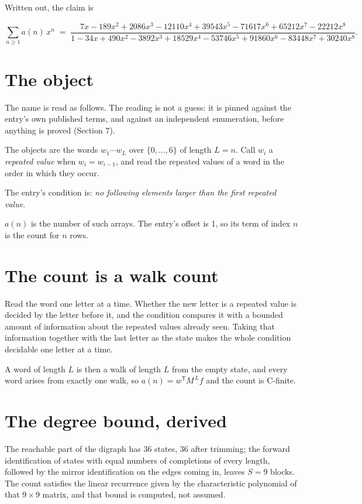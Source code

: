 \documentclass[11pt]{article}
\theoremstyle{definition}
\begin{document}
Written out, the claim is

\[\sum_{n \ge 1} a(n)\,x^n \;=\; \frac{7x - 189x^{2} + 2086x^{3} - 12110x^{4} + 39543x^{5} - 71617x^{6} + 65212x^{7} - 22212x^{8}}{1 - 34x + 490x^{2} - 3892x^{3} + 18529x^{4} - 53746x^{5} + 91860x^{6} - 83448x^{7} + 30240x^{8}}.\]

\section{The object}

The name is read as follows. The reading is not a guess: it is pinned against the entry's own published terms, and against an independent enumeration, before anything is proved (Section 7).

The objects are the words $w_1\cdots w_L$ over $\{0,\dots,6\}$ of length $L = n$. Call $w_i$ a {\itshape repeated value} when $w_i = w_{i-1}$, and read the repeated values of a word in the order in which they occur.

The entry's condition is: {\itshape no following elements larger than the first repeated value}.

$a(n)$ is the number of such arrays. The entry's offset is 1, so its term of index $n$ is the count for $n$ rows.

\section{The count is a walk count}

Read the word one letter at a time. Whether the new letter is a repeated value is decided by the letter before it, and the condition compares it with a bounded amount of information about the repeated values already seen. Taking that information together with the last letter as the state makes the whole condition decidable one letter at a time.

A word of length $L$ is then a walk of length $L$ from the empty state, and every word arises from exactly one walk, so $a(n) = w^{\mathsf T}M^{\,L}f$ and the count is C-finite.

\section{The degree bound, derived}

The reachable part of the digraph has $36$ states, $36$ after trimming; the forward identification of states with equal numbers of completions of every length, followed by the mirror identification on the edges coming in, leaves $S = 9$ blocks. The count satisfies the linear recurrence given by the characteristic polynomial of that $9\times9$ matrix, and that bound is computed, not assumed.
\end{document}
